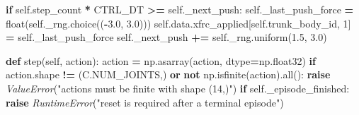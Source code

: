 \documentclass[
  chinese,
  11pt,
  letterpaper,
]{article}
\newenvironment{Shaded}{\begin{snugshade}}{\end{snugshade}}
\newcommand{\BuiltInTok}[1]{#1}
\newcommand{\ControlFlowTok}[1]{\textcolor[rgb]{0.13,0.29,0.53}{\textbf{#1}}}
\newcommand{\DecValTok}[1]{\textcolor[rgb]{0.00,0.00,0.81}{#1}}
\newcommand{\FloatTok}[1]{\textcolor[rgb]{0.00,0.00,0.81}{#1}}
\newcommand{\KeywordTok}[1]{\textcolor[rgb]{0.13,0.29,0.53}{\textbf{#1}}}
\newcommand{\NormalTok}[1]{#1}
\newcommand{\OperatorTok}[1]{\textcolor[rgb]{0.81,0.36,0.00}{\textbf{#1}}}
\newcommand{\PreprocessorTok}[1]{\textcolor[rgb]{0.56,0.35,0.01}{\textit{#1}}}
\newcommand{\StringTok}[1]{\textcolor[rgb]{0.31,0.60,0.02}{#1}}
\newcommand{\VariableTok}[1]{\textcolor[rgb]{0.00,0.00,0.00}{#1}}
\renewenvironment{Shaded}{\par\smallskip}{\par\smallskip}
\begin{document}
\begin{Shaded}
\begin{Highlighting}[]
        \ControlFlowTok{if} \VariableTok{self}\NormalTok{.step\_count }\OperatorTok{*}\NormalTok{ CTRL\_DT }\OperatorTok{\textgreater{}=} \VariableTok{self}\NormalTok{.\_next\_push:}
            \VariableTok{self}\NormalTok{.\_last\_push\_force }\OperatorTok{=} \BuiltInTok{float}\NormalTok{(}\VariableTok{self}\NormalTok{.\_rng.choice((}\OperatorTok{{-}}\FloatTok{3.0}\NormalTok{, }\FloatTok{3.0}\NormalTok{)))}
            \VariableTok{self}\NormalTok{.data.xfrc\_applied[}\VariableTok{self}\NormalTok{.trunk\_body\_id, }\DecValTok{1}\NormalTok{] }\OperatorTok{=} \VariableTok{self}\NormalTok{.\_last\_push\_force}
            \VariableTok{self}\NormalTok{.\_next\_push }\OperatorTok{+=} \VariableTok{self}\NormalTok{.\_rng.uniform(}\FloatTok{1.5}\NormalTok{, }\FloatTok{3.0}\NormalTok{)}

    \KeywordTok{def}\NormalTok{ step(}\VariableTok{self}\NormalTok{, action):}
\NormalTok{        action }\OperatorTok{=}\NormalTok{ np.asarray(action, dtype}\OperatorTok{=}\NormalTok{np.float32)}
        \ControlFlowTok{if}\NormalTok{ action.shape }\OperatorTok{!=}\NormalTok{ (C.NUM\_JOINTS,) }\KeywordTok{or} \KeywordTok{not}\NormalTok{ np.isfinite(action).}\BuiltInTok{all}\NormalTok{():}
            \ControlFlowTok{raise} \PreprocessorTok{ValueError}\NormalTok{(}\StringTok{"actions must be finite with shape (14,)"}\NormalTok{)}
        \ControlFlowTok{if} \VariableTok{self}\NormalTok{.\_episode\_finished:}
            \ControlFlowTok{raise} \PreprocessorTok{RuntimeError}\NormalTok{(}\StringTok{"reset is required after a terminal episode"}\NormalTok{)}


\end{Highlighting}
\end{Shaded}
\end{document}
